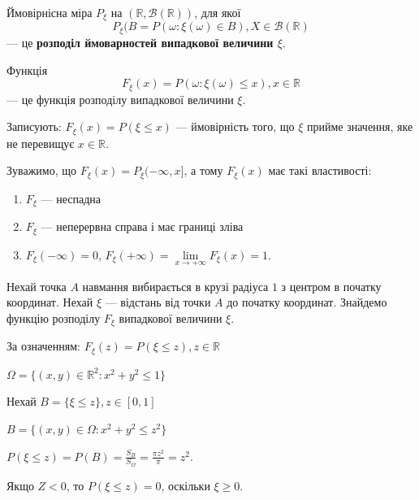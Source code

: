\begin{definition}
    Ймовірнісна міра $P_{\xi}$ на $(\mathbb{R}, \mathcal{B}(\mathbb{R}))$,
    для  якої  
    $$P_{\xi}(B
    = P(\omega: \xi(\omega) \in B), X \in \mathcal{B}(\mathbb{R})$$
    --- це \textbf{розподіл ймоварностей випадкової величини $\xi$}.
\end{definition}

\begin{definition}
    Функція
    $$F_{\xi}(x) = P(\omega: \xi(\omega) \leqslant x), x \in \mathbb{R}$$
    --- це функція розподілу випадкової величини $\xi$.
\end{definition} 

Записують: $F_{\xi}(x) = P(\xi \leqslant x)$ --- ймовірність того, що
$\xi$ прийме значення, яке не перевищує $x \in \mathbb{R}$.

Зуважимо, що $F_{\xi}(x) = P_{\xi}(-\infty, x]$, а тому $F_{\xi}(x)$ має 
такі властивості:

\begin{enumerate}
    \item $F_{\xi}$ --- неспадна
    
    \item $F_{\xi}$ --- неперервна справа і має границі зліва
    
    \item $F_{\xi}(-\infty) = 0$,
    $F_{\xi}(+\infty) = \lim\limits_{x \rightarrow +\infty} F_{\xi}(x) = 1$.
\end{enumerate}

\begin{example}
\end{example}
Нехай точка $A$ навмання вибирається в крузі радіуса $1$ з центром
в початку координат. 
Нехай $\xi$ --- відстань від точки $A$ до початку координат.
Знайдемо функцію розподілу $F_{\xi}$ випадкової величини $\xi$.

За означенням:
$F_{\xi}(z)
= P(\xi \leqslant z), z \in \mathbb{R}$

\beautifulImage

$\Omega = \{(x, y) \in \mathbb{R}^2: x^2 + y^2 \leqslant 1\}$

Нехай $B = \{\xi \leqslant z\}, z \in [0, 1]$

$B = \{(x, y) \in \Omega: x^2 + y^2 \leqslant z^2\}$

$P(\xi \leqslant z)
= P(B)
= \frac{S_B}{S_{\Omega}}
= \frac{\pi z^2}{\pi}
= z^2.$

Якщо $Z < 0$, то $P(\xi \leqslant z) = 0$, оскільки $\xi \geqslant 0$.

